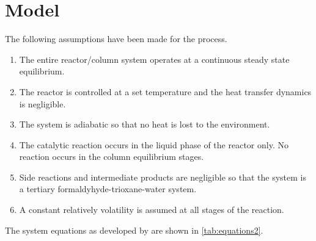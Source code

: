 \documentclass[12pt, A4paper]{article}
\newcounter{inputs}
\newcounter{outputs}
\newcounter{parameters}
\begin{document}
\section{Model}
The following assumptions have been made for the process.
\begin{enumerate}
\item The entire reactor/column system operates at a continuous steady state equilibrium.
\item The reactor is controlled at a set temperature and the heat transfer dynamics is negligible.
\item The system is adiabatic so that no heat is lost to the environment.
\item The catalytic reaction occurs in the liquid phase of the reactor only. No reaction occurs in the column equilibrium stages.
\item Side reactions and intermediate products are negligible so that the system is a tertiary formaldyhyde-trioxane-water system.
\item A constant relatively volatility is assumed at all stages of the reaction.
\end{enumerate}

The system equations as developed by \citet{HU19991353} are shown in \autoref{tab:equations2}. %

%
\end{document}
